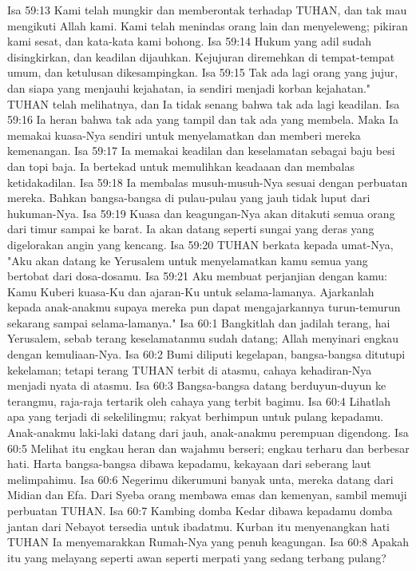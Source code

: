 Isa 59:13  Kami telah mungkir dan memberontak terhadap TUHAN, dan tak mau mengikuti Allah kami. Kami telah menindas orang lain dan menyeleweng; pikiran kami sesat, dan kata-kata kami bohong.
Isa 59:14  Hukum yang adil sudah disingkirkan, dan keadilan dijauhkan. Kejujuran diremehkan di tempat-tempat umum, dan ketulusan dikesampingkan.
Isa 59:15  Tak ada lagi orang yang jujur, dan siapa yang menjauhi kejahatan, ia sendiri menjadi korban kejahatan." TUHAN telah melihatnya, dan Ia tidak senang bahwa tak ada lagi keadilan.
Isa 59:16  Ia heran bahwa tak ada yang tampil dan tak ada yang membela. Maka Ia memakai kuasa-Nya sendiri untuk menyelamatkan dan memberi mereka kemenangan.
Isa 59:17  Ia memakai keadilan dan keselamatan sebagai baju besi dan topi baja. Ia bertekad untuk memulihkan keadaaan dan membalas ketidakadilan.
Isa 59:18  Ia membalas musuh-musuh-Nya sesuai dengan perbuatan mereka. Bahkan bangsa-bangsa di pulau-pulau yang jauh tidak luput dari hukuman-Nya.
Isa 59:19  Kuasa dan keagungan-Nya akan ditakuti semua orang dari timur sampai ke barat. Ia akan datang seperti sungai yang deras yang digelorakan angin yang kencang.
Isa 59:20  TUHAN berkata kepada umat-Nya, "Aku akan datang ke Yerusalem untuk menyelamatkan kamu semua yang bertobat dari dosa-dosamu.
Isa 59:21  Aku membuat perjanjian dengan kamu: Kamu Kuberi kuasa-Ku dan ajaran-Ku untuk selama-lamanya. Ajarkanlah kepada anak-anakmu supaya mereka pun dapat mengajarkannya turun-temurun sekarang sampai selama-lamanya."
Isa 60:1  Bangkitlah dan jadilah terang, hai Yerusalem, sebab terang keselamatanmu sudah datang; Allah menyinari engkau dengan kemuliaan-Nya.
Isa 60:2  Bumi diliputi kegelapan, bangsa-bangsa ditutupi kekelaman; tetapi terang TUHAN terbit di atasmu, cahaya kehadiran-Nya menjadi nyata di atasmu.
Isa 60:3  Bangsa-bangsa datang berduyun-duyun ke terangmu, raja-raja tertarik oleh cahaya yang terbit bagimu.
Isa 60:4  Lihatlah apa yang terjadi di sekelilingmu; rakyat berhimpun untuk pulang kepadamu. Anak-anakmu laki-laki datang dari jauh, anak-anakmu perempuan digendong.
Isa 60:5  Melihat itu engkau heran dan wajahmu berseri; engkau terharu dan berbesar hati. Harta bangsa-bangsa dibawa kepadamu, kekayaan dari seberang laut melimpahimu.
Isa 60:6  Negerimu dikerumuni banyak unta, mereka datang dari Midian dan Efa. Dari Syeba orang membawa emas dan kemenyan, sambil memuji perbuatan TUHAN.
Isa 60:7  Kambing domba Kedar dibawa kepadamu domba jantan dari Nebayot tersedia untuk ibadatmu. Kurban itu menyenangkan hati TUHAN Ia menyemarakkan Rumah-Nya yang penuh keagungan.
Isa 60:8  Apakah itu yang melayang seperti awan seperti merpati yang sedang terbang pulang?
